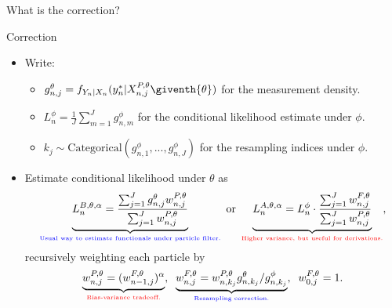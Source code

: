 \documentclass{beamer}
\begin{document}
\begin{frame}{What is the correction?}
    \begin{block}{Correction}
        \begin{itemize}
            \item Write:\pause
            \begin{itemize}
                \item $g^{\theta}_{n,j}={f}_{{Y}_{n}|{X}_{n}}(y_{n}^{*}|{X}_{n,j}^{P,\theta}\giventh{\theta})$ for the measurement density.\pause
                \item $L_n^{\phi} = \frac{1}{J}\sum_{m=1}^{J}g^{\phi}_{n,m}$ for the conditional likelihood estimate under $\phi$.\pause
                \item $k_j \sim \text{Categorical}(g^{\phi}_{n,1},...,g^{\phi}_{n,J})$ for the resampling indices under $\phi$. \pause
            \end{itemize}
            \item Estimate conditional likelihood under $\theta$ as
            \pause
            \begin{equation}
     \label{eq:mop-conditional-likelihood}
     \underbrace{L_n^{B,\theta,\alpha} = \frac{\sum_{j=1}^Jg^\theta_{n,j} w^{P,\theta}_{n,j}}{\sum_{j=1}^J  w^{P,\theta}_{n,j}}}_{\textcolor{blue}{\text{\tiny{Usual way to estimate functionals under particle filter.}}}} \text{ or } \underbrace{L_n^{A,\theta,\alpha} = L_n^\phi\cdot \frac{\sum_{j=1}^J w^{F,\theta}_{n,j}}{\sum_{j=1}^J  w^{P,\theta}_{n,j}}}_{\textcolor{red}{\text{\tiny{Higher variance, but useful for derivations.}}}},
    \end{equation}
    \pause
    recursively weighting each particle by 
    \pause
    \begin{equation}
        \label{eq:weighting-scheme}
        \underbrace{w_{n,j}^{P,\theta} = (w_{n-1,j}^{F,\theta})^\alpha}_{\textcolor{red}{\text{\tiny{Bias-variance tradeoff.}}}}, \;\; \underbrace{w^{F,\theta}_{n,j} = w^{P,\theta}_{n,k_j} { g^{\theta}_{n,k_j}}/{ g^{\phi}_{n,k_j}}}_{\textcolor{blue}{\text{\tiny{Resampling correction.}}}}, \;\; w^{F,\theta}_{0,j}= 1.
    \end{equation}
        \end{itemize}
    \end{block}
\end{frame}
\end{document}
